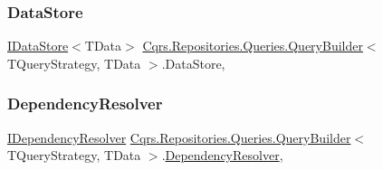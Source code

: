 \subsubsection{\texorpdfstring{Data\+Store}{DataStore}}
{\footnotesize\ttfamily \hyperlink{interfaceCqrs_1_1DataStores_1_1IDataStore}{I\+Data\+Store}$<$T\+Data$>$ \hyperlink{classCqrs_1_1Repositories_1_1Queries_1_1QueryBuilder}{Cqrs.\+Repositories.\+Queries.\+Query\+Builder}$<$ T\+Query\+Strategy, T\+Data $>$.Data\+Store\hspace{0.3cm}{\ttfamily [get]}, {\ttfamily [protected]}}

\mbox{\label{classCqrs_1_1Repositories_1_1Queries_1_1QueryBuilder_aef22b10001de3e15a2817f8446a5b5f4_aef22b10001de3e15a2817f8446a5b5f4}} 
\subsubsection{\texorpdfstring{Dependency\+Resolver}{DependencyResolver}}
{\footnotesize\ttfamily \hyperlink{interfaceCqrs_1_1Configuration_1_1IDependencyResolver}{I\+Dependency\+Resolver} \hyperlink{classCqrs_1_1Repositories_1_1Queries_1_1QueryBuilder}{Cqrs.\+Repositories.\+Queries.\+Query\+Builder}$<$ T\+Query\+Strategy, T\+Data $>$.\hyperlink{classCqrs_1_1Configuration_1_1DependencyResolver}{Dependency\+Resolver}\hspace{0.3cm}{\ttfamily [get]}, {\ttfamily [protected]}}

